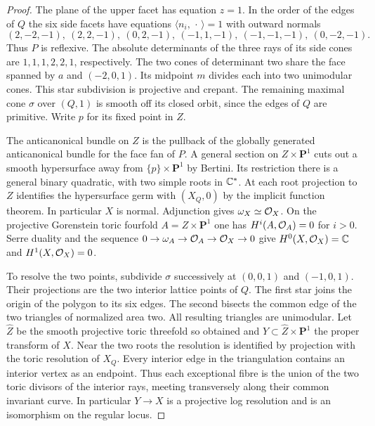 \begin{proof}
The plane of the upper facet has equation $z=1$. In the order of
the edges of $Q$ the six side facets have equations
$\langle n_i,\,\cdot\,\rangle=1$ with outward normals
\[
 (2,-2,-1),\ (2,2,-1),\ (0,2,-1),\
 (-1,1,-1),\ (-1,-1,-1),\ (0,-2,-1).
\]
Thus $P$ is reflexive. The absolute determinants of the three rays
of its side cones are $1,1,1,2,2,1$, respectively. The two cones of
determinant two share the face spanned by $a$ and $(-2,0,1)$.
Its midpoint $m$ divides each into two unimodular cones. This star
subdivision is projective and crepant. The remaining maximal cone
$\sigma$ over $(Q,1)$ is smooth off its closed orbit, since the
edges of $Q$ are primitive. Write $p$ for its fixed point in $Z$.

The anticanonical bundle on $Z$ is the pullback of the globally
generated anticanonical bundle for the face fan of $P$. A general
section on $Z\times\mathbf P^1$ cuts out a smooth hypersurface away
from $\{p\}\times\mathbf P^1$ by Bertini. Its restriction there is
a general binary quadratic, with two simple roots in $\mathbb C^*$.
At each root projection to $Z$ identifies the hypersurface germ
with $(X_Q,0)$ by the implicit function theorem. In particular $X$
is normal. Adjunction gives $\omega_X\simeq\mathcal O_X$. On the projective
Gorenstein toric fourfold $A=Z\times\mathbf P^1$ one has
$H^i(A,\mathcal O_A)=0$ for $i>0$. Serre duality and the sequence
$0\to\omega_A\to\mathcal O_A\to\mathcal O_X\to0$ give
$H^0(X,\mathcal O_X)=\mathbb C$ and $H^1(X,\mathcal O_X)=0$.

To resolve the two points, subdivide $\sigma$ successively at
$(0,0,1)$ and $(-1,0,1)$. Their projections are the two interior
lattice points of $Q$. The first star joins the origin of the
polygon to its six edges. The second bisects the common edge of the
two triangles of normalized area two. All resulting triangles are
unimodular. Let $\widehat Z$ be the smooth projective toric
threefold so obtained and $Y\subset\widehat Z\times\mathbf P^1$
the proper transform of $X$. Near the two roots the resolution
is identified by projection with the toric resolution of $X_Q$.
Every interior edge in the triangulation contains an interior vertex
as an endpoint. Thus each exceptional fibre is the union of the two
toric divisors of the interior rays, meeting transversely along their
common invariant curve. In particular $Y\to X$ is a projective log
resolution and is an isomorphism on the regular locus.


\end{proof}

